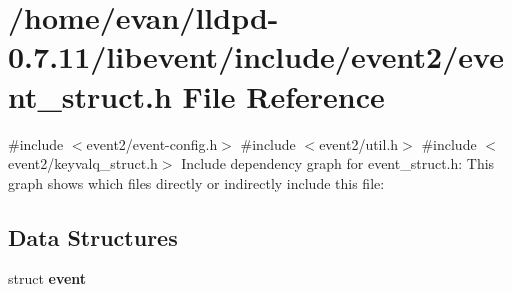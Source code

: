\section{/home/evan/lldpd-\/0.7.11/libevent/include/event2/event\-\_\-struct.h \-File \-Reference}
\label{event__struct_8h}
{\ttfamily \#include $<$event2/event-\/config.\-h$>$}\*
{\ttfamily \#include $<$event2/util.\-h$>$}\*
{\ttfamily \#include $<$event2/keyvalq\-\_\-struct.\-h$>$}\*
\-Include dependency graph for event\-\_\-struct.\-h\-:
\-This graph shows which files directly or indirectly include this file\-:
\subsection*{\-Data \-Structures}
\begin{DoxyCompactItemize}
\item 
struct {\bf event}
\end{DoxyCompactItemize}
